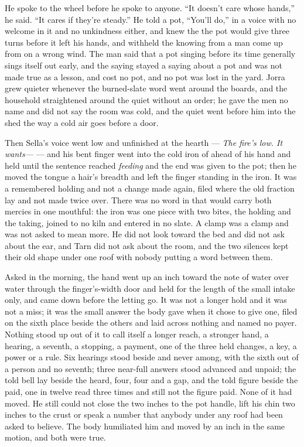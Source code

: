 He spoke to the wheel before he spoke to anyone. “It doesn't care whose hands,” he said. “It cares if they're steady.” He told a pot, “You'll do,” in a voice with no welcome in it and no unkindness either, and knew the  the pot would give three turns before it left his hands, and withheld the knowing from a man come up from  on a wrong wind. The man said that a pot singing before its time generally sings itself out early, and the saying stayed a saying about a pot and was not made true as a lesson, and cost no pot, and no pot was lost in the yard. Jorra grew quieter whenever the burned-slate word went around the boards, and the household straightened around the quiet without an order; he gave the men no name and did not say the room was cold, and the quiet went before him into the shed the way a cold air goes before a door.

Then Sella's voice went low and unfinished at the hearth --- \emph{The fire's low. It wants---} --- and his bent finger went into the cold iron of  ahead of his hand and held until the sentence reached \emph{feeding} and the end was given to the pot; then he moved the tongue a hair's breadth and left the finger standing in the iron. It was a remembered holding and not a change made again, filed where the old fraction lay and not made twice over. There was no word in  that would carry both mercies in one mouthful: the iron was one piece with two bites, the holding and the taking, joined to no kiln and entered in no slate. A clamp was a clamp and was not asked to mean more. He did not look toward the bed and did not ask about the ear, and Tarn did not ask about the room, and the two silences kept their old shape under one roof with nobody putting a word between them.

\scenebreak

Asked in the morning, the hand went up an inch toward the note of water over water through the finger's-width door and held for the length of the small intake only, and came down before the letting go. It was not a longer hold and it was not a miss; it was the small answer the body gave when it chose to give one, filed on the sixth place beside the others and laid across nothing and named no payer. Nothing stood up out of it to call itself a longer reach, a stronger hand, a hearing, a seventh, a stopping, a payment, one of the three held changes, a key, a power or a rule. Six hearings stood beside and never among, with the sixth out of a person and no seventh; three near-full answers stood advanced and unpaid; the told bell lay beside the heard, four, four and a gap, and the told figure beside the paid, one in twelve read three times and still not the figure paid. None of it had moved. He still could not close the two inches to the pot handle, lift his chin two inches to the crust or speak a number that anybody under any roof had been asked to believe. The body humiliated him and moved by an inch in the same motion, and both were true.

